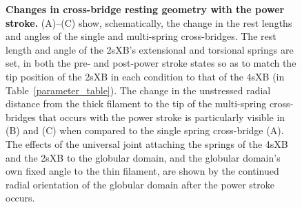 \documentclass[10pt]{article}
\begin{document}
\begin{figure}[!ht]
    \begin{center}
    \end{center}
    \caption{ \textbf{Changes in cross-bridge resting geometry with the power stroke.}
        (A)--(C) show, schematically, the change in the rest lengths and angles of the single and multi-spring cross-bridges. 
        The rest length and angle of the 2sXB's extensional and torsional springs are set, in both the pre- and post-power stroke states so as to match the tip position of the 2sXB in each condition to that of the 4sXB (in Table~\ref{parameter_table}).
        The change in the unstressed radial distance from the thick filament to the tip of the multi-spring cross-bridges that occurs with the power stroke is particularly visible in (B) and (C) when compared to the single spring cross-bridge (A).
        The effects of the universal joint attaching the springs of the 4sXB and the 2sXB to the globular domain, and the globular domain's own fixed angle to the thin filament, are shown by the continued radial orientation of the globular domain after the power stroke occurs.
        }
    \label{fig_power_stroke_changes}
\end{figure}


\end{document}
